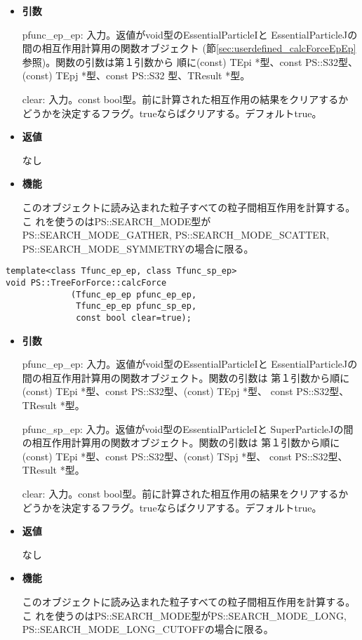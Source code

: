 \begin{itemize}

\item {\bf 引数}

pfunc\_ep\_ep: 入力。返値がvoid型のEssentialParticleIと
EssentialParticleJの間の相互作用計算用の関数オブジェクト
(節\ref{sec:userdefined_calcForceEpEp}参照)。関数の引数は第１引数から
順に(const) TEpi *型、const PS::S32型、(const) TEpj *型、const PS::S32
型、TResult *型。

clear: 入力。const bool型。前に計算された相互作用の結果をクリアするか
どうかを決定するフラグ。trueならばクリアする。デフォルトtrue。

\item {\bf 返値}

なし

\item {\bf 機能}

このオブジェクトに読み込まれた粒子すべての粒子間相互作用を計算する。こ
れを使うのはPS::SEARCH\_MODE型がPS::SEARCH\_MODE\_GATHER,
PS::SEARCH\_MODE\_SCATTER, PS::SEARCH\_MODE\_SYMMETRYの場合に限る。

\end{itemize}

\begin{screen}
\begin{verbatim}
template<class Tfunc_ep_ep, class Tfunc_sp_ep>
void PS::TreeForForce::calcForce
             (Tfunc_ep_ep pfunc_ep_ep,
              Tfunc_ep_ep pfunc_sp_ep,
              const bool clear=true);
\end{verbatim}
\end{screen}

\begin{itemize}

\item {\bf 引数}

pfunc\_ep\_ep: 入力。返値がvoid型のEssentialParticleIと
EssentialParticleJの間の相互作用計算用の関数オブジェクト。関数の引数は
第１引数から順に(const) TEpi *型、const PS::S32型、(const) TEpj *型、
const PS::S32型、TResult *型。

pfunc\_sp\_ep: 入力。返値がvoid型のEssentialParticleIと
SuperParticleJの間の相互作用計算用の関数オブジェクト。関数の引数は
第１引数から順に(const) TEpi *型、const PS::S32型、(const) TSpj *型、
const PS::S32型、TResult *型。

clear: 入力。const bool型。前に計算された相互作用の結果をクリアするか
どうかを決定するフラグ。trueならばクリアする。デフォルトtrue。

\item {\bf 返値}

なし

\item {\bf 機能}

このオブジェクトに読み込まれた粒子すべての粒子間相互作用を計算する。こ
れを使うのはPS::SEARCH\_MODE型がPS::SEARCH\_MODE\_LONG,\\
PS::SEARCH\_MODE\_LONG\_CUTOFFの場合に限る。

\end{itemize}

